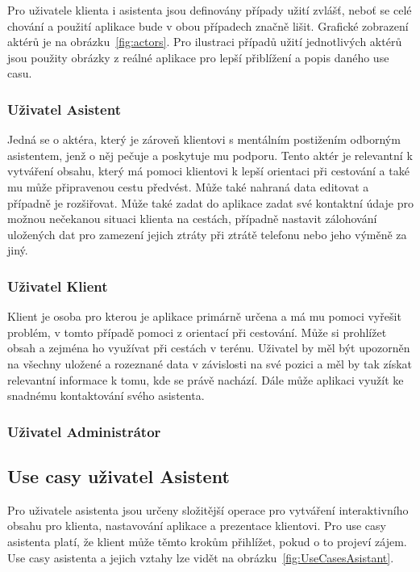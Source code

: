 \documentclass[czech,master,public,dept460,male,java,cpdeclaration]{diploma}
\begin{document}
Pro uživatele klienta i asistenta jsou definovány případy užití zvlášť, neboť se celé chování
a použití aplikace bude v obou případech značně lišit. Grafické zobrazení aktérů je na obrázku~\ref{fig:actors}.
Pro ilustraci případů užití jednotlivých aktérů jsou použity obrázky z reálné aplikace pro
lepší přiblížení a popis daného use casu.

\subsubsection{Uživatel Asistent}
Jedná se o aktéra, který je zároveň klientovi s mentálním postižením odborným asistentem,
jenž o něj pečuje a poskytuje mu podporu. Tento aktér je relevantní k vytváření obsahu,
který má pomoci klientovi k lepší orientaci při cestování a také mu může připravenou
cestu předvést. Může také nahraná data editovat a případně je rozšiřovat. Může také zadat
do aplikace zadat své kontaktní údaje pro možnou nečekanou situaci klienta na cestách, případně
nastavit zálohování uložených dat pro zamezení jejich ztráty při ztrátě telefonu nebo jeho výměně
za jiný.

\subsubsection{Uživatel Klient}
Klient je osoba pro kterou je aplikace primárně určena a má mu pomoci vyřešit problém,
v tomto případě pomoci z orientací při cestování. Může si prohlížet obsah a zejména ho
využívat při cestách v terénu. Uživatel by měl být upozorněn na všechny uložené a rozeznané
data v závislosti na své pozici a měl by tak získat relevantní informace k tomu, kde se právě
nachází. Dále může aplikaci využít ke snadnému kontaktování svého asistenta.



\subsubsection{Uživatel Administrátor}


\subsection{Use casy uživatel Asistent}
Pro uživatele asistenta jsou určeny složitější operace pro vytváření interaktivního obsahu pro klienta,
nastavování aplikace a prezentace klientovi. Pro use casy asistenta platí, že klient může těmto
krokům přihlížet, pokud o to projeví zájem. Use casy asistenta a jejich vztahy lze vidět na obrázku~\ref{fig:UseCasesAsistant}.
\end{document}
